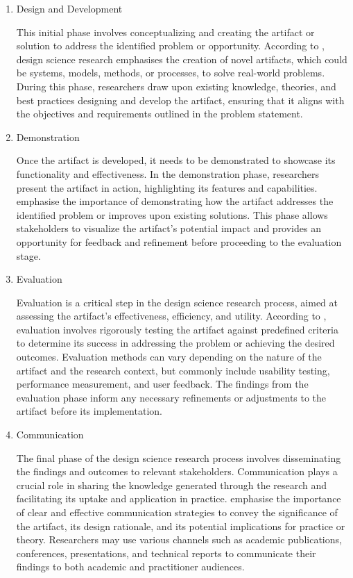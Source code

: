 {\begin{enumerate}
        \item Design and Development
\par{This initial phase involves conceptualizing and creating the artifact or solution to address the identified problem or opportunity. According to \cite{hevner2004design}, design science research emphasises the creation of novel artifacts, which could be systems, models, methods, or processes, to solve real-world problems. During this phase, researchers draw upon existing knowledge, theories, and best practices designing and develop the artifact, ensuring that it aligns with the objectives and requirements outlined in the problem statement.}
        \item Demonstration
\par{Once the artifact is developed, it needs to be demonstrated to showcase its functionality and effectiveness. In the demonstration phase, researchers present the artifact in action, highlighting its features and capabilities. \cite{peffers2007design} emphasise the importance of demonstrating how the artifact addresses the identified problem or improves upon existing solutions. This phase allows stakeholders to visualize the artifact's potential impact and provides an opportunity for feedback and refinement before proceeding to the evaluation stage.}
        \item Evaluation
\par{Evaluation is a critical step in the design science research process, aimed at assessing the artifact's effectiveness, efficiency, and utility. According to \cite{hevner2004design}, evaluation involves rigorously testing the artifact against predefined criteria to determine its success in addressing the problem or achieving the desired outcomes. Evaluation methods can vary depending on the nature of the artifact and the research context, but commonly include usability testing, performance measurement, and user feedback. The findings from the evaluation phase inform any necessary refinements or adjustments to the artifact before its implementation.}
        \item Communication
\par{The final phase of the design science research process involves disseminating the findings and outcomes to relevant stakeholders. Communication plays a crucial role in sharing the knowledge generated through the research and facilitating its uptake and application in practice. \cite{march1995design} emphasise the importance of clear and effective communication strategies to convey the significance of the artifact, its design rationale, and its potential implications for practice or theory. Researchers may use various channels such as academic publications, conferences, presentations, and technical reports to communicate their findings to both academic and practitioner audiences.}
\end{enumerate}}

